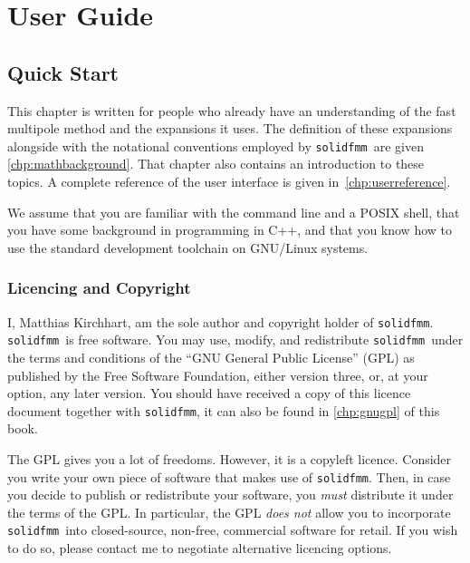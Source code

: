 \documentclass{scrbook}
\newcommand{\solidfmm}{\texttt{solidfmm}}
\begin{document}
\maketitle

\tableofcontents

\mainmatter

\part{User Guide}

\chapter{Quick Start}\label{chp:quickstart}
This chapter is written for people who already have an understanding of 
the fast multipole method and the expansions it uses. The definition of these
expansions alongside with the notational conventions employed by \solidfmm\ are
given \cref{chp:mathbackground}. That chapter also contains an introduction to
these topics. A complete reference of the user interface is given
in~\cref{chp:userreference}.

We assume that you are familiar with the command line and a POSIX shell, that
you have some background in programming in C++, and that you know how to use
the standard development toolchain on GNU/Linux systems.

\section{Licencing and Copyright}
I, Matthias Kirchhart, am the sole author and copyright holder of \solidfmm.
\solidfmm\ is free software. You may use, modify, and redistribute \solidfmm\
under the terms and conditions of the \enquote{GNU General Public License} (GPL)
as published by the Free Software Foundation, either version three, or, at your
option, any later version. You should have received a copy of this licence
document together with \solidfmm, it can also be found in \cref{chp:gnugpl} of
this book. 

The GPL gives you a lot of freedoms. However, it is a copyleft licence.
Consider you write your own piece of software that makes use of \solidfmm. Then,
in case you decide to publish or redistribute your software, you \emph{must}
distribute it under the terms of the GPL. In particular, the GPL \emph{does not}
allow you to incorporate \solidfmm\ into closed-source, non-free, commercial
software for retail. If you wish to do so, please contact me to negotiate
alternative licencing options.
\end{document}
